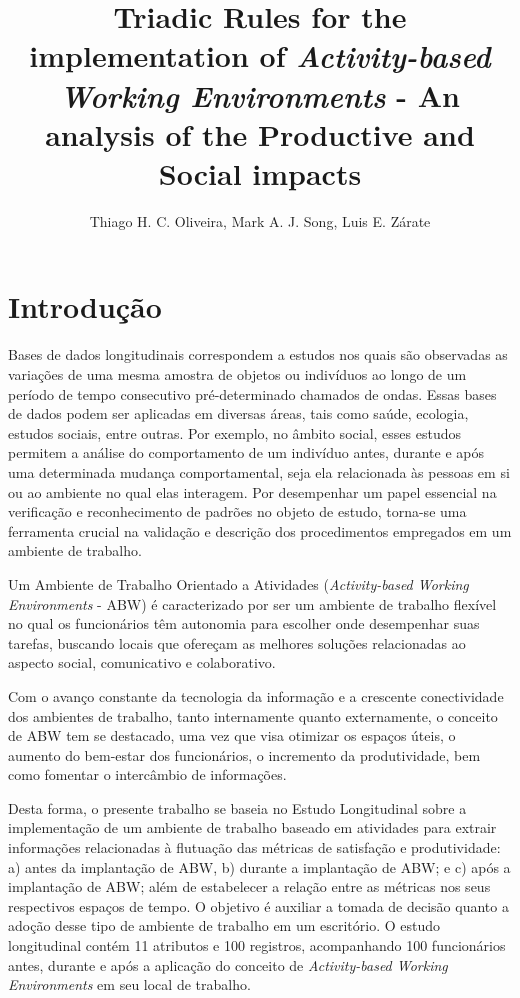 \documentclass[kdmile,a4paper]{kdmile} %
\title{{Triadic Rules for the implementation of \textit{Activity-based Working Environments} - An analysis of the Productive and Social impacts}}
\author{Thiago H. C. Oliveira, Mark A. J. Song, Luis E. Zárate}
\institute{Pontifícia Universidade Católica de Minas Gerais, Departamento de Ciência da Computação, Brasil \\
\email{thcoliveira@sga.pucminas.br, song@pucminas.br, zarate@pucminas.br}
}
\begin{document}
\maketitle


\section{Introdução}

Bases de dados longitudinais correspondem a estudos nos quais são observadas as variações de uma mesma amostra de objetos ou indivíduos ao longo de um período de tempo consecutivo pré-determinado chamados de ondas. Essas bases de dados podem ser aplicadas em diversas áreas, tais como saúde, ecologia, estudos sociais, entre outras. Por exemplo, no âmbito social, esses estudos permitem a análise do comportamento de um indivíduo antes, durante e após uma determinada mudança comportamental, seja ela relacionada às pessoas em si ou ao ambiente no qual elas interagem. Por desempenhar um papel essencial na verificação e reconhecimento de padrões no objeto de estudo, torna-se uma ferramenta crucial na validação e descrição dos procedimentos empregados em um ambiente de trabalho.


Um Ambiente de Trabalho Orientado a Atividades (\textit{Activity-based Working Environments} - ABW) é caracterizado por ser um ambiente de trabalho flexível no qual os funcionários têm autonomia para escolher onde desempenhar suas tarefas, buscando locais que ofereçam as melhores soluções relacionadas ao aspecto social, comunicativo e colaborativo.

Com o avanço constante da tecnologia da informação e a crescente conectividade dos ambientes de trabalho, tanto internamente quanto externamente, o conceito de ABW tem se destacado, uma vez que visa  otimizar os espaços úteis, o aumento do bem-estar dos funcionários, o incremento da produtividade, bem como fomentar  o intercâmbio de informações.

Desta forma, o presente trabalho se baseia no Estudo Longitudinal sobre a implementação de um ambiente de trabalho baseado em atividades \cite{HALLDORSSON2022107920} para extrair informações relacionadas à flutuação das métricas de satisfação e produtividade: a) antes da implantação de ABW, b) durante a implantação de ABW; e c) após a implantação de ABW; além de estabelecer a relação entre as métricas nos seus respectivos espaços de tempo. O objetivo é auxiliar a tomada de decisão quanto a adoção desse tipo de ambiente de trabalho em um escritório. O estudo longitudinal contém 11 atributos e 100 registros, acompanhando 100 funcionários antes, durante e após a aplicação do conceito de \textit{Activity-based Working Environments} em seu local de trabalho.
\end{document}

